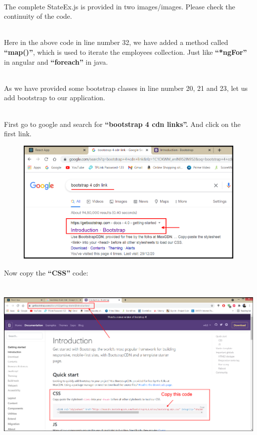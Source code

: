 \documentclass{article}
\begin{document}
\noindent 

\noindent \\
The complete StateEx.js is provided in two images/images. Please check the continuity of the code.

\noindent \\
Here in the above code in line number 32, we have added a method called \textbf{``map()''}, which is used to iterate the employees collection. Just like \textbf{``*ngFor''} in angular and \textbf{``foreach''} in java.

\noindent 

\noindent \\
As we have provided some bootstrap classes in line number 20, 21 and 23, let us add bootstrap to our application.

\noindent 

\noindent \\
First go to google and search for \textbf{``bootstrap 4 cdn links''. } And click on the first link.

\begin{center}
	\noindent \includegraphics*[width=6.26in, height=2.39in]{IMG-09-13}
\end{center}

\noindent 

\noindent 
Now copy the \textbf{``CSS''} code:

\begin{center}
	\noindent \includegraphics*[width=6.24in, height=3.36in]{IMG-09-14}
\end{center}
\end{document}
